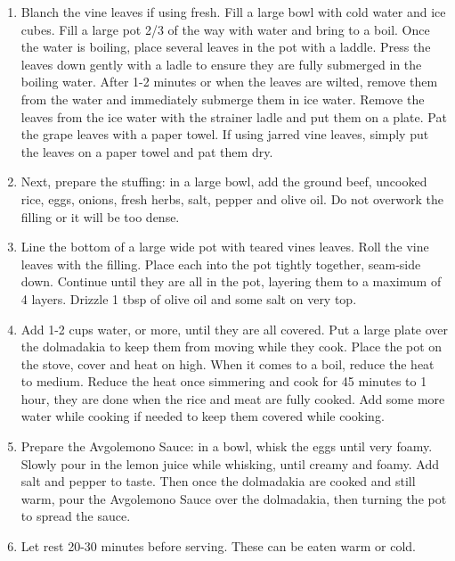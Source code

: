 \begin{enumerate}
    \item Blanch the vine leaves if using fresh. Fill a large bowl with cold water and ice cubes. Fill a large pot 2/3 of the way with water and bring to a boil. Once the water is boiling, place several leaves in the pot with a laddle. Press the leaves down gently with a ladle to ensure they are fully submerged in the boiling water. After 1-2 minutes or when the leaves are wilted, remove them from the water and immediately submerge them in ice water. Remove the leaves from the ice water with the strainer ladle and put them on a plate. Pat the grape leaves with a paper towel. If using jarred vine leaves, simply put the leaves on a paper towel and pat them dry.
    \item Next, prepare the stuffing: in a large bowl, add the ground beef, uncooked rice, eggs, onions, fresh herbs, salt, pepper and olive oil. Do not overwork the filling or it will be too dense.
    \item Line the bottom of a large wide pot with teared vines leaves. Roll the vine leaves with the filling. Place each into the pot tightly together, seam-side down. Continue until they are all in the pot, layering them to a maximum of 4 layers. Drizzle 1 tbsp of olive oil and some salt on very top.
    \item Add 1-2 cups water, or more, until they are all covered. Put a large plate over the dolmadakia to keep them from moving while they cook. Place the pot on the stove, cover and heat on high. When it comes to a boil, reduce the heat to medium. Reduce the heat once simmering and cook for 45 minutes to 1 hour, they are done when the rice and meat are fully cooked. Add some more water while cooking if needed to keep them covered while cooking.
    \item Prepare the Avgolemono Sauce: in a bowl, whisk the eggs until very foamy. Slowly pour in the lemon juice while whisking, until creamy and foamy. Add salt and pepper to taste. Then once the dolmadakia are cooked and still warm, pour the Avgolemono Sauce over the dolmadakia, then turning the pot to spread the sauce.
    \item Let rest 20-30 minutes before serving. These can be eaten warm or cold.
\end{enumerate}

